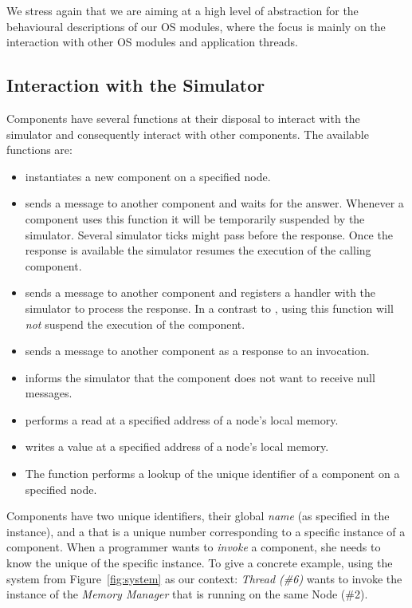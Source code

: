 We stress again that we are aiming at a high level of abstraction for the behavioural descriptions of our OS modules, where the focus is mainly on the interaction with other OS modules and application threads.


\subsection{Interaction with the Simulator}

Components have several functions at their disposal to interact with the simulator and consequently interact with other components.
The available functions are:
\begin{itemize}
\item {}
instantiates a new component on a specified node.
\item {}
sends a message to another component and waits for the answer.
Whenever a component uses this function it will be temporarily suspended by the simulator.
Several simulator ticks might pass before the response.
Once the response is available the simulator resumes the execution of the calling component.
\item {}
sends a message to another component and registers a handler with the simulator to process the response.
In a contrast to , using this function will \emph{not} suspend the execution of the component.
\item {}
sends a message to another component as a response to an invocation.
\item {}
informs the simulator that the component does not want to receive null messages.
\item {}
performs a read at a specified address of a node's local memory.
\item {}
writes a value at a specified address of a node's local memory.
\item The function {}
performs a lookup of the unique identifier of a component on a specified node.
\end{itemize}
Components have two unique identifiers, their global \emph{name} (as specified in the  instance), and a  that is a unique number corresponding to a specific instance of a component.
When a programmer wants to \emph{invoke} a component, she needs to know the unique \mbox{} of the specific instance.
To give a concrete example, using the system from Figure~\ref{fig:system} as our context: \emph{Thread (\#6)} wants to invoke the instance of the \emph{Memory Manager} that is running on the same Node (\#2).
